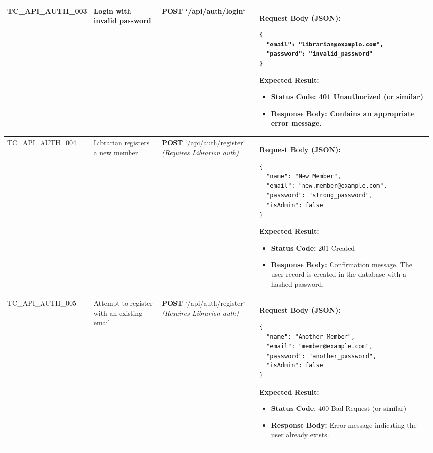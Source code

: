 \begin{longtable}{|>{\scriptsize\raggedright\arraybackslash}p{2.5cm}|>{\raggedright\arraybackslash}p{3cm}|>{\raggedright\arraybackslash}p{4cm}|>{\raggedright\arraybackslash}p{6.5cm}|}
TC\_API\_AUTH\_003 & Login with invalid password & \textbf{POST} \newline `/api/auth/login`  & \textbf{Request Body (JSON):}
\begin{lstlisting}
{
  "email": "librarian@example.com",
  "password": "invalid_password"
}
\end{lstlisting}
\textbf{Expected Result:}
\begin{itemize}[noitemsep, topsep=0pt, leftmargin=*]
    \item \textbf{Status Code:} 401 Unauthorized (or similar)
    \item \textbf{Response Body:} Contains an appropriate error message. 
\end{itemize} \\ \hline

TC\_API\_AUTH\_004 & Librarian registers a new member & \textbf{POST} \newline `/api/auth/register`  \newline \textit{(Requires Librarian auth)} & \textbf{Request Body (JSON):}
\begin{lstlisting}
{
  "name": "New Member",
  "email": "new.member@example.com",
  "password": "strong_password",
  "isAdmin": false
}
\end{lstlisting}
\textbf{Expected Result:}
\begin{itemize}[noitemsep, topsep=0pt, leftmargin=*]
    \item \textbf{Status Code:} 201 Created
    \item \textbf{Response Body:} Confirmation message. The user record is created in the database with a hashed password. 
\end{itemize} \\ \hline

TC\_API\_AUTH\_005 & Attempt to register with an existing email & \textbf{POST} \newline `/api/auth/register`  \newline \textit{(Requires Librarian auth)} & \textbf{Request Body (JSON):}
\begin{lstlisting}
{
  "name": "Another Member",
  "email": "member@example.com",
  "password": "another_password",
  "isAdmin": false
}
\end{lstlisting}
\textbf{Expected Result:}
\begin{itemize}[noitemsep, topsep=0pt, leftmargin=*]
    \item \textbf{Status Code:} 400 Bad Request (or similar)
    \item \textbf{Response Body:} Error message indicating the user already exists. 
\end{itemize} \\ \hline


\end{longtable}
